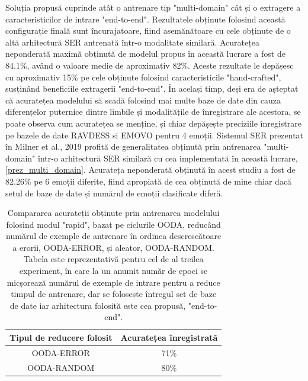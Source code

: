 \documentclass[a4paper,12pt]{book}
\begin{document}
		 \par
		 Soluția propusă cuprinde atât o antrenare tip "multi-domain" cât și o extragere a caracteristicilor de intrare "end-to-end". Rezultatele obținute folosind această configurație finală sunt încurajatoare, fiind asemănătoare cu cele obținute de o altă arhitectură SER antrenată într-o modalitate similară. Acuratețea neponderată maximă obținută de modelul propus în această lucrare a fost de 84.1\%, având o valoare medie de aproximativ 82\%. Aceste rezultate le depășesc cu aproximativ 15\% pe cele obținute folosind caracteristicile "hand-crafted", susținând beneficiile extragerii "end-to-end". În același timp, deși era de așteptat că acuratețea modelului să scadă folosind mai multe baze de date din cauza diferențelor  puternice dintre limbile și modalitățile de înregistrare ale acestora, se poate observa cum acuratețea se menține, și chiar depășește preciziile înregistrare pe bazele de date RAVDESS si EMOVO pentru 4 emoții. Sistemul SER prezentat în Milner et al., 2019 \cite{multi-domain} profită de generalitatea obținută prin antrenarea "multi-domain" într-o arhitectură SER similară cu cea implementată în această lucrare, \ref{prez_multi_domain}. Acurateța neponderată obținută în acest studiu a fost de 82.26\% pe 6 emoții diferite, fiind apropiată de cea obținută de mine chiar dacă setul de baze de date și numărul de emoții clasificate diferă. \par		 
		 
		 \bgroup
			\def\arraystretch{1.2}
			\begin{table}[t] \centering
				\caption{Compararea acurateții obținute prin antrenarea modelului folosind modul "rapid", bazat pe ciclurile OODA, reducând numărul de exemple de antrenare în ordinea descrescătoare a erorii, OODA-ERROR, și aleator, OODA-RANDOM. Tabela este reprezentativă pentru cel de al treilea experiment, în care la un anumit număr de epoci se micșorează numărul de exemple de intrare pentru a reduce timpul de antrenare, dar se folosește întregul set de baze de date iar arhitectura folosită este cea propusă, "end-to-end".
				}
		 	\begin{tabular}{cc}
		 		\hline
		 		Tipul de reducere folosit & Acuratețea înregistrată	\\ \hline
		 		OODA-ERROR                & 71\%                    \\
		 		OODA-RANDOM               & 80\%                    \\ \hline
		 	\end{tabular}
		 	\label{tab:ooda-table}
		 \end{table}
	 	 \egroup
	
\end{document}
